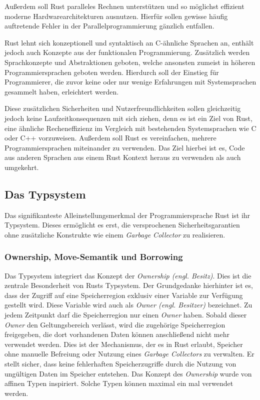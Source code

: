 Außerdem soll Rust paralleles Rechnen unterstützen und
so möglichst effizient moderne Hardwarearchitekturen ausnutzen.
Hierfür sollen gewisse häufig auftretende Fehler in der Parallelprogrammierung gänzlich entfallen.
\cite{theRustLanguage}

Rust lehnt sich konzeptionell und syntaktisch an C-ähnliche Sprachen an, enthält jedoch auch Konzepte aus der
funktionalen Programmierung. Zusätzlich werden Sprachkonzepte und Abstraktionen geboten, welche
ansonsten zumeist in höheren Programmiersprachen geboten werden. Hierdurch soll der Einstieg für
Programmierer, die zuvor keine oder nur wenige Erfahrungen mit Systemsprachen gesammelt haben, erleichtert werden.
\cite{engineeringServo}

Diese zusätzlichen Sicherheiten und Nutzerfreundlichkeiten sollen gleichzeitig jedoch keine Laufzeitkonsequenzen mit 
sich ziehen, denn es ist ein Ziel von Rust, 
eine ähnliche Recheneffizienz im Vergleich mit bestehenden Systemsprachen wie C oder C++ vorzuweisen.
Außerdem soll Rust es vereinfachen, mehrere Programmiersprachen miteinander zu verwenden.
Das Ziel hierbei ist es, Code aus anderen Sprachen aus einem Rust Kontext heraus zu verwenden als auch umgekehrt.
\cite{rustBook}


\subsection{Das Typsystem}

Das signifikanteste Alleinstellungsmerkmal der Programmiersprache Rust ist ihr Typsystem. Dieses ermöglicht es
erst, die versprochenen Sicherheitsgarantien ohne zusätzliche Konstrukte wie einem \textit{Garbage Collector}
zu realisieren.\cite{rustBook}

\subsubsection{Ownership, Move-Semantik und Borrowing}

Das Typsystem integriert das Konzept der \textit{Ownership (engl. Besitz)}.
Dies ist die zentrale Besonderheit von Rusts Typsystem.
Der Grundgedanke hierhinter ist es, dass der Zugriff auf eine Speicherregion exklusiv einer Variable
zur Verfügung gestellt wird. Diese Variable wird auch als \textit{Owner (engl. Besitzer)} bezeichnet.
Zu jedem Zeitpunkt darf die Speicherregion nur einen \textit{Owner} haben.
Sobald dieser \textit{Owner} den Geltungsbereich verlässt, wird die zugehörige Speicherregion freigegeben,
die dort vorhandenen Daten können anschließend nicht mehr verwendet werden.
Dies ist der Mechanismus, der es in Rust erlaubt, Speicher ohne manuelle Befreiung oder Nutzung eines
\textit{Garbage Collectors} zu verwalten. Er stellt sicher, dass keine fehlerhaften Speicherzugriffe
durch die Nutzung von ungültigen Daten im Speicher entstehen.\cite{rustBook}
Das Konzept des \textit{Ownership} wurde von affinen Typen inspiriert.\cite{embeddedRustOS}
Solche Typen können maximal ein mal verwendet werden.\cite{affineTypes}

